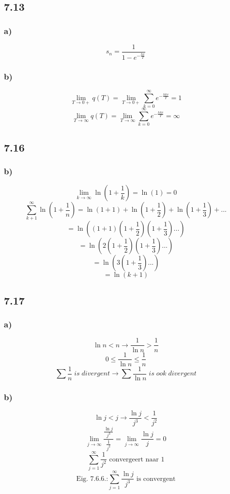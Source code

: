 \documentclass[11pt]{article}
\begin{document}
\subsection*{7.13}
\subsubsection*{a)}
\[
s_n = \frac{1}{1-e^{-\frac{hv}{T}}}
\]
\subsubsection*{b)}
\[
\lim_{T\rightarrow 0+}q(T) = \lim_{T\rightarrow 0+}\sum_{k=0}^\infty e^{-\frac{hkv}{T}}
=1
\]
\[
\lim_{T\rightarrow \infty}q(T) =\lim_{T\rightarrow \infty}\sum_{k=0}^\infty e^{-\frac{hkv}{T}}
=\infty
\]

\subsection*{7.16}
\subsubsection*{b)}
\[
\lim_{k\rightarrow\infty}\ln\left(1+\frac{1}{k}\right)= \ln(1)=0
\]
\[
\sum_{k+1}^\infty \ln\left(1+\frac{1}{n}\right)= \ln(1+1) + \ln\left(1+\frac{1}{2}\right) + \ln\left(1+\frac{1}{3}\right) + ...
\]
\[
=\ln \left( (1+1)(1+\frac{1}{2})(1+\frac{1}{3})...\right)
\]
\[
=\ln \left( 2 (1+\frac{1}{2})(1+\frac{1}{3})...\right)
\]
\[
=\ln \left( 3(1+\frac{1}{3})...\right)
\]
\[
=\ln(k+1)
\]

\subsection*{7.17}
\subsubsection*{a)}
\[
\ln n < n \rightarrow \frac{1}{\ln n} > \frac{1}{n}
\]
\[
0 \le \frac{1}{\ln n} \le \frac{1}{n}
\]
\[
\sum\frac{1}{n}\;is\;divergent \rightarrow \sum\frac{1}{\ln n}\;is\;ook\;divergent
\]
\subsubsection*{b)}
$$\ln j < j \rightarrow \frac{\ln j}{j ^3} < \frac{1}{j ^2} $$
$$\lim_{j\rightarrow\infty}\frac{\frac{\ln j}{j ^3}}{\frac{1}{j ^2}} = \lim_{j\rightarrow\infty}\frac{\ln j}{j} = 0$$
$$\sum_{j=1}^\infty \frac{1}{j^2}  \text{  convergeert naar 1}$$
$$\text{Eig. 7.6.6.:} \sum_{j=1}^\infty \frac{\ln j}{j^3}  \text{  is convergent}$$
\end{document}
